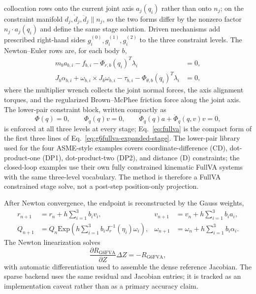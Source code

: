 \documentclass[preprint,12pt]{elsarticle}
\begin{document}
collocation rows onto the current joint axis $a_j(q_i)$ rather than onto
$n_j$; on the constraint manifold $d_j,\dot d_j,\ddot d_j\parallel n_j$, so
the two forms differ by the nonzero factor $n_j\cdot a_j(q_i)$ and define the
same stage solution. Driven mechanisms add prescribed right-hand sides
$g^{(0)}_i,g^{(1)}_i,g^{(2)}_i$ to the three constraint levels. The
Newton--Euler rows are, for each body $b$,
\begin{align}
  m_b a_{b,i}-f_{b,i}-\Phi_{r,b}(q_i)^T\lambda_i &=0,
  \label{eq:trans-balance}\\
  J_b\alpha_{b,i}+\omega_{b,i}\times J_b\omega_{b,i}
  -\tau_{b,i}-\Phi_{\theta,b}(q_i)^T\lambda_i &=0,
  \label{eq:rot-balance}
\end{align}
where the multiplier wrench collects the joint normal forces, the axis
alignment torques, and the regularized Brown--McPhee friction force along the
joint axis. The lower-pair constraint block, written compactly as
\begin{equation}
  \Phi(q)=0,\qquad
  \Phi_q(q)v=0,\qquad
  \Phi_q(q)a+\dot{\Phi}_q(q,v)v=0,
  \label{eq:fullva}
\end{equation}
is enforced at all three levels at every stage; Eq.~\eqref{eq:fullva} is
the compact form of the first three lines of
Eq.~\eqref{eq:g6fullva-expanded-stage}. The lower-pair library used
for the four ASME-style examples covers coordinate-difference (CD),
dot-product-one (DP1), dot-product-two (DP2), and distance (D) constraints;
the closed-loop examples use their own fully constrained kinematic FullVA
systems with the same three-level vocabulary. The method is therefore a
FullVA constrained stage solve, not a post-step position-only projection.


After Newton convergence, the endpoint is reconstructed by the Gauss weights,
\begin{align}
  r_{n+1} &= r_n+h\sum_{i=1}^3 b_i v_i, &
  v_{n+1} &= v_n+h\sum_{i=1}^3 b_i a_i, \label{eq:end-trans}\\
  Q_{n+1} &= Q_n\mathrm{Exp}\!\left(h\sum_{i=1}^3 b_i
      J_r^{-1}(\eta_i)\omega_i\right), &
  \omega_{n+1} &= \omega_n+h\sum_{i=1}^3 b_i \alpha_i .
  \label{eq:end-rot}
\end{align}
The Newton linearization solves
\begin{equation}
  \frac{\partial R_{\mathrm{G6FVA}}}{\partial Z}\Delta Z
  =-R_{\mathrm{G6FVA}},
  \label{eq:newton}
\end{equation}
with automatic differentiation used to assemble the dense reference Jacobian.
The sparse backend uses the same residual and Jacobian entries; it is tracked
as an implementation caveat rather than as a primary accuracy claim.
\end{document}
